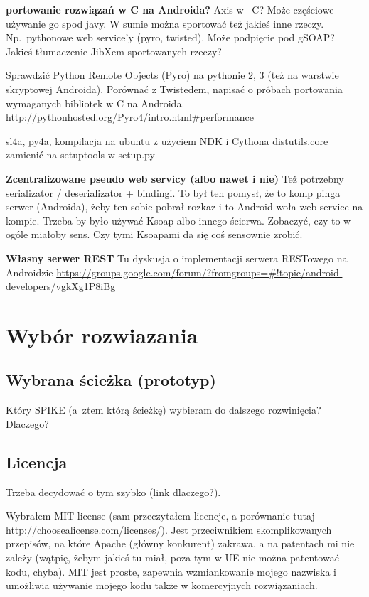 \textbf{portowanie rozwiązań w C na Androida?}
Axis w~ C? Może częściowe używanie go spod javy. W sumie można sportować też jakieś inne rzeczy. Np.\ pythonowe web service'y (pyro, twisted). Może podpięcie pod gSOAP? Jakieś tłumaczenie JibXem sportowanych rzeczy?

Sprawdzić Python Remote Objects (Pyro) na pythonie 2, 3 (też na warstwie skryptowej Androida). Porównać z Twistedem, napisać o próbach portowania wymaganych bibliotek w C na Androida. \url{http://pythonhosted.org/Pyro4/intro.html#performance}

sl4a, py4a, kompilacja na ubuntu z użyciem NDK i Cythona
distutils.core zamienić na setuptools w setup.py

\textbf{Zcentralizowane pseudo web servicy (albo nawet i nie)}
Też potrzebny serializator / deserializator + bindingi. To był ten pomysł, że to komp pinga serwer (Androida), żeby ten sobie pobrał rozkaz i to Android woła web service na kompie. Trzeba by było używać Ksoap albo innego ścierwa. Zobaczyć, czy to w ogóle miałoby sens. Czy tymi Ksoapami da się coś sensownie zrobić.

\textbf{Własny serwer REST}
Tu dyskusja o implementacji serwera RESTowego na Androidzie \url{https://groups.google.com/forum/?fromgroups=#!topic/android-developers/vgkXg1P8iBg}





\section{Wybór rozwiazania}
\subsection{Wybrana ścieżka (prototyp)}
Który SPIKE (a~ztem którą ścieżkę) wybieram do dalszego rozwinięcia?
Dlaczego?

\subsection{Licencja}
Trzeba decydować o tym szybko (link dlaczego?).

Wybrałem MIT license (sam przeczytałem licencje, a porównanie tutaj http://choosealicense.com/licenses/). Jest przeciwnikiem skomplikowanych przepisów, na które Apache (główny konkurent) zakrawa, a na patentach mi nie zależy (wątpię, żebym jakieś tu miał, poza tym w UE nie można patentować kodu, chyba). MIT jest proste, zapewnia wzmiankowanie mojego nazwiska i umożliwia używanie mojego kodu także w komercyjnych rozwiązaniach.

